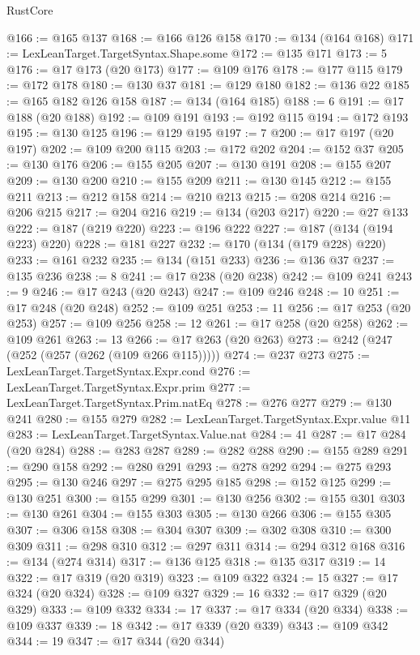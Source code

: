 \begin{lexlean}{RustCore}
\begin{coremodule}
@166 := @165 @137
@168 := @166 @126 @158
@170 := @134 (@164 @168)
@171 := LexLeanTarget.TargetSyntax.Shape.some
@172 := @135 @171
@173 := 5
@176 := @17 @173 (@20 @173)
@177 := @109 @176
@178 := @177 @115
@179 := @172 @178
@180 := @130 @37
@181 := @129 @180
@182 := @136 @22
@185 := @165 @182 @126 @158
@187 := @134 (@164 @185)
@188 := 6
@191 := @17 @188 (@20 @188)
@192 := @109 @191
@193 := @192 @115
@194 := @172 @193
@195 := @130 @125
@196 := @129 @195
@197 := 7
@200 := @17 @197 (@20 @197)
@202 := @109 @200 @115
@203 := @172 @202
@204 := @152 @37
@205 := @130 @176
@206 := @155 @205
@207 := @130 @191
@208 := @155 @207
@209 := @130 @200
@210 := @155 @209
@211 := @130 @145
@212 := @155 @211
@213 := @212 @158
@214 := @210 @213
@215 := @208 @214
@216 := @206 @215
@217 := @204 @216
@219 := @134 (@203 @217)
@220 := @27 @133
@222 := @187 (@219 @220)
@223 := @196 @222
@227 := @187 (@134 (@194 @223) @220)
@228 := @181 @227
@232 := @170 (@134 (@179 @228) @220)
@233 := @161 @232
@235 := @134 (@151 @233)
@236 := @136 @37
@237 := @135 @236
@238 := 8
@241 := @17 @238 (@20 @238)
@242 := @109 @241
@243 := 9
@246 := @17 @243 (@20 @243)
@247 := @109 @246
@248 := 10
@251 := @17 @248 (@20 @248)
@252 := @109 @251
@253 := 11
@256 := @17 @253 (@20 @253)
@257 := @109 @256
@258 := 12
@261 := @17 @258 (@20 @258)
@262 := @109 @261
@263 := 13
@266 := @17 @263 (@20 @263)
@273 := @242 (@247 (@252 (@257 (@262 (@109 @266 @115)))))
@274 := @237 @273
@275 := LexLeanTarget.TargetSyntax.Expr.cond
@276 := LexLeanTarget.TargetSyntax.Expr.prim
@277 := LexLeanTarget.TargetSyntax.Prim.natEq
@278 := @276 @277
@279 := @130 @241
@280 := @155 @279
@282 := LexLeanTarget.TargetSyntax.Expr.value @11
@283 := LexLeanTarget.TargetSyntax.Value.nat
@284 := 41
@287 := @17 @284 (@20 @284)
@288 := @283 @287
@289 := @282 @288
@290 := @155 @289
@291 := @290 @158
@292 := @280 @291
@293 := @278 @292
@294 := @275 @293
@295 := @130 @246
@297 := @275 @295 @185
@298 := @152 @125
@299 := @130 @251
@300 := @155 @299
@301 := @130 @256
@302 := @155 @301
@303 := @130 @261
@304 := @155 @303
@305 := @130 @266
@306 := @155 @305
@307 := @306 @158
@308 := @304 @307
@309 := @302 @308
@310 := @300 @309
@311 := @298 @310
@312 := @297 @311
@314 := @294 @312 @168
@316 := @134 (@274 @314)
@317 := @136 @125
@318 := @135 @317
@319 := 14
@322 := @17 @319 (@20 @319)
@323 := @109 @322
@324 := 15
@327 := @17 @324 (@20 @324)
@328 := @109 @327
@329 := 16
@332 := @17 @329 (@20 @329)
@333 := @109 @332
@334 := 17
@337 := @17 @334 (@20 @334)
@338 := @109 @337
@339 := 18
@342 := @17 @339 (@20 @339)
@343 := @109 @342
@344 := 19
@347 := @17 @344 (@20 @344)

\end{coremodule}
\end{lexlean}
